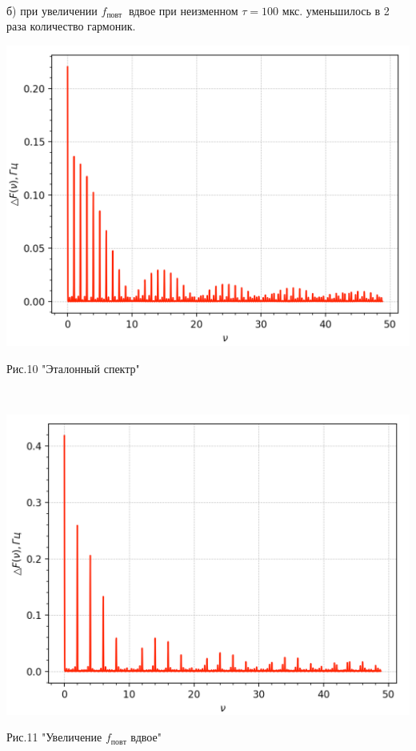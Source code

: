 \documentclass[a4paper,12pt]{article} %
\begin{document}
\\
\
\\
\

б) при увеличении $f_{\text {повт }}$ вдвое при неизменном $\tau=100$ мкс. уменьшилось в 2 раза количество гармоник. 

\begin{minipage}{0.44\textwidth}
\includegraphics[width=\linewidth]{1.png}\\
\begin{center}
Рис.10 "Эталонный спектр"
\end{center}
\end{minipage}
\begin{minipage}{0.1\textwidth}
\ \ \ \ \ \ \Rightarrow
\end{minipage}
\begin{minipage}{0.44\textwidth}
\includegraphics[width=\linewidth]{3.png}\\
\begin{center}
Рис.11 "Увеличение $f_{повт}$ вдвое"
\end{center}
\end{minipage}
\end{document}

